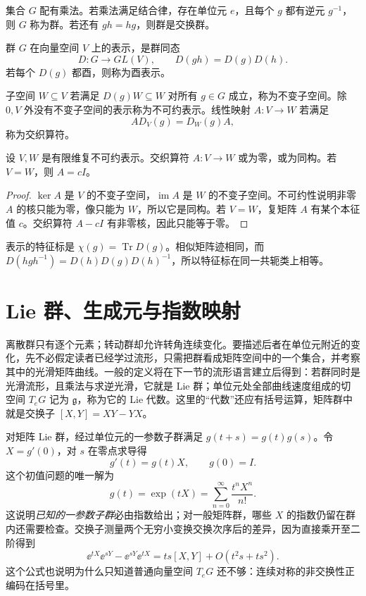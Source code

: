 \begin{definition}[群]
集合 \(G\) 配有乘法。若乘法满足结合律，存在单位元 \(e\)，且每个
\(g\) 都有逆元 \(g^{-1}\)，则 \(G\) 称为群。若还有
\(gh=hg\)，则群是交换群。
\end{definition}

\begin{definition}[表示]
群 \(G\) 在向量空间 \(V\) 上的表示，是群同态
\[
D:G\longrightarrow GL(V),
\qquad D(gh)=D(g)D(h).
\]
若每个 \(D(g)\) 都酉，则称为酉表示。
\end{definition}

子空间 \(W\subseteq V\) 若满足 \(D(g)W\subseteq W\) 对所有
\(g\in G\) 成立，称为不变子空间。除 \(0,V\) 外没有不变子空间的表示称为不可约表示。线性映射 \(A:V\to W\) 若满足
\[
AD_V(g)=D_W(g)A,
\]
称为交织算符。

\begin{theorem}[Schur 引理]
设 \(V,W\) 是有限维复不可约表示。交织算符 \(A:V\to W\) 或为零，或为同构。若 \(V=W\)，则 \(A=cI\)。
\end{theorem}

\begin{proof}
\(\ker A\) 是 \(V\) 的不变子空间，\(\operatorname{im}A\) 是 \(W\) 的不变子空间。不可约性说明非零 \(A\) 的核只能为零，像只能为
\(W\)，所以它是同构。若 \(V=W\)，复矩阵 \(A\) 有某个本征值
\(c\)。交织算符 \(A-cI\) 有非零核，因此只能等于零。
\end{proof}

表示的特征标是 \(\chi(g)=\operatorname{Tr}D(g)\)。相似矩阵迹相同，而
\(D(hgh^{-1})=D(h)D(g)D(h)^{-1}\)，所以特征标在同一共轭类上相等。

\section{Lie 群、生成元与指数映射}

离散群只有逐个元素；转动群却允许转角连续变化。要描述后者在单位元附近的变化，先不必假定读者已经学过流形，只需把群看成矩阵空间中的一个集合，并考察其中的光滑矩阵曲线。一般的定义将在下一节的流形语言建立后得到：若群同时是光滑流形，且乘法与求逆光滑，它就是 Lie 群；单位元处全部曲线速度组成的切空间 $T_eG$ 记为 $\mathfrak g$，称为它的 Lie 代数。这里的“代数”还应有括号运算，矩阵群中就是交换子 $[X,Y]=XY-YX$。

对矩阵 Lie 群，经过单位元的一参数子群满足
\(g(t+s)=g(t)g(s)\)。令 \(X=g'(0)\)，对 \(s\) 在零点求导得
\[
g'(t)=g(t)X,\qquad g(0)=I.
\]
这个初值问题的唯一解为
\[
g(t)=\exp(tX)=\sum_{n=0}^{\infty}\frac{t^nX^n}{n!}.
\]
这说明\emph{已知的一参数子群}必由指数给出；对一般矩阵群，哪些 $X$ 的指数仍留在群内还需要检查。交换子测量两个无穷小变换交换次序后的差异，因为直接乘开至二阶得到
\[
\ee^{tX}\ee^{sY}-\ee^{sY}\ee^{tX}
=ts[X,Y]+O(t^2s+ts^2).
\]
这个公式也说明为什么只知道普通向量空间 $T_eG$ 还不够：连续对称的非交换性正编码在括号里。

